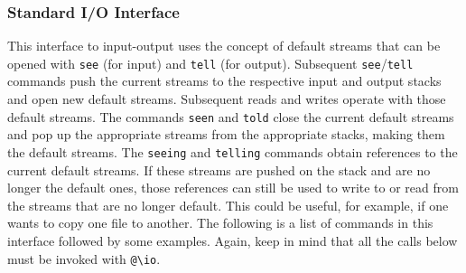 \documentclass[11pt]{article}
\newcommand{\bs}{\textbackslash}
\begin{document}
\subsubsection{Standard I/O Interface}

This interface to input-output uses the
concept of default streams that can be opened with \texttt{see} (for input)
and \texttt{tell} (for output). Subsequent \texttt{see}/\texttt{tell}
commands push the current streams to the respective input and output stacks
and open new default streams. Subsequent reads and writes operate with
those default streams. The commands \texttt{seen} and \texttt{told} close
the current default streams and pop up the appropriate streams from the
appropriate stacks, making them the default streams.  
The \texttt{seeing} and \texttt{telling} commands obtain references to the
current default streams. If these streams are pushed on the stack and are
no longer the default ones, those references can still be used to write to or
read from the streams that are no longer default. This could be useful, for
example, if one wants to copy one file to another. The following
is a list of commands in this interface followed by some examples.
Again, keep in mind that all the calls below must be invoked with
\texttt{@\bs{}io}.
\end{document}
